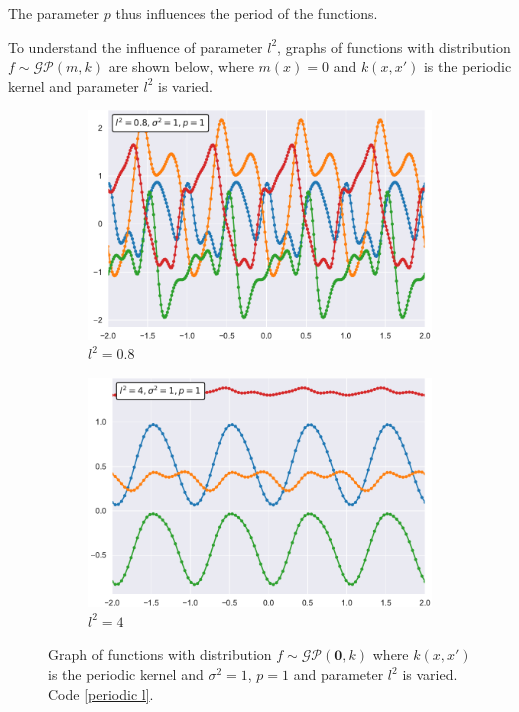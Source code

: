 The parameter $p$ thus influences the period of the functions.

To understand the influence of parameter $l^2$, graphs of functions with distribution $f\sim \mathcal{GP}(m,k)$ are shown below, where $m(x)=0$ and $k(x,x')$ is the periodic kernel and parameter $l^2$ is varied.

\begin{figure}[h]
\centering
\begin{subfigure}{.5\textwidth}
  \centering
  \includegraphics[width=\linewidth]{images/Gaussian process/Periodic - l=0.8.pdf}
  \caption{$l^2=0.8$}
\end{subfigure}%
\begin{subfigure}{.5\textwidth}
  \centering
  \includegraphics[width=\linewidth]{images/Gaussian process/Periodic - l=4.pdf}
  \caption{$l^2=4$}
\end{subfigure}
\caption{Graph of functions with distribution  $f\sim \mathcal{GP}(\bm{0},k)$ where $k(x,x')$ is the periodic kernel and $\sigma^2=1$, $p=1$ and parameter $l^2$ is varied. Code \ref{periodic l}.}
\label{10 sample periodic modified l}
\end{figure}

